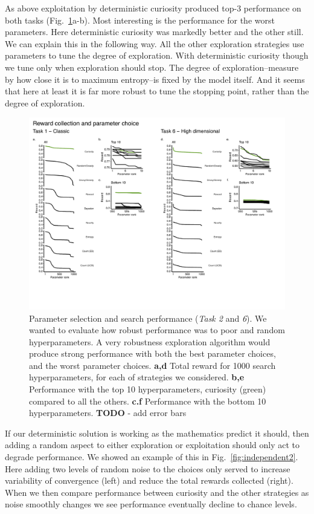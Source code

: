 As above exploitation by deterministic curiosity produced top-3 performance on both tasks (Fig.~\ref{fig:robust}a-b). Most interesting is the performance for the worst parameters. Here deterministic curiosity was markedly better and the other still. We can explain this in the following way. All the other exploration strategies use parameters to tune the degree of exploration. With deterministic curiosity though we tune only when exploration should stop. The degree of exploration--measure by how close it is to maximum entropy--is fixed by the model itself. And it seems that here at least it is far more robust to tune the stopping point, rather than the degree of exploration.

\begin{figure}
	\begin{fullwidth}
	\includegraphics[width=0.8\linewidth]{img/robust.pdf} 
	\caption{Parameter selection and search performance (\textit{Task 2} and \textit{6}). We wanted to evaluate how robust performance was to poor and random hyperparameters. A very robustness exploration algorithm would produce strong performance with both the best parameter choices, and the worst parameter choices.   
	\textbf{a,d} Total reward for 1000 search hyperparameters, for each of strategies we considered.  
	\textbf{b,e} Performance with the top 10 hyperparameters, curiosity (green) compared to all the others.
	\textbf{c.f} Performance with the bottom 10 hyperparameters.
	\textbf{TODO} - add error bars
	}
	\label{fig:robust}
	\end{fullwidth}
\end{figure}

If our deterministic solution is working as the mathematics predict it should,  then adding a random aspect to either exploration or exploitation should only act to degrade performance. We showed an example of this in Fig.~\ref{fig:independent2}. Here adding two levels of random noise to the choices only served to increase variability of convergence (left) and reduce the total rewards collected (right). When we then compare performance between curiosity and the other strategies as noise smoothly changes we see performance eventually decline to chance levels. 

